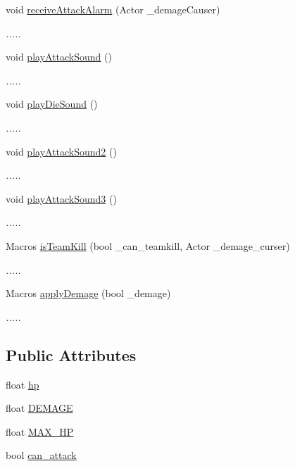 \begin{DoxyCompactItemize}
void \hyperlink{class_enemy___character_af291c216d2d7ce2c83e71cb151cf13ee}{receive\+Attack\+Alarm} (Actor \+\_\+demage\+Causer)
\begin{DoxyCompactList}\small\item\em ..... \end{DoxyCompactList}\item 
void \hyperlink{class_enemy___character_a8c8cc52e86cc963f5655b148bd39d27a}{play\+Attack\+Sound} ()
\begin{DoxyCompactList}\small\item\em ..... \end{DoxyCompactList}\item 
void \hyperlink{class_enemy___character_a7e4f2603e52f32f5823ec13e3bfea030}{play\+Die\+Sound} ()
\begin{DoxyCompactList}\small\item\em ..... \end{DoxyCompactList}\item 
void \hyperlink{class_enemy___character_ada6e551c65c0dd91b7e8342036406e7a}{play\+Attack\+Sound2} ()
\begin{DoxyCompactList}\small\item\em ..... \end{DoxyCompactList}\item 
void \hyperlink{class_enemy___character_a0cf94922a5d6b054efaa3a37ec4557e6}{play\+Attack\+Sound3} ()
\begin{DoxyCompactList}\small\item\em ..... \end{DoxyCompactList}\item 
Macros \hyperlink{class_enemy___character_a05b0072de08ac991ff3bc139c4be350f}{is\+Team\+Kill} (bool \+\_\+can\+\_\+teamkill, Actor \+\_\+demage\+\_\+curser)
\begin{DoxyCompactList}\small\item\em ..... \end{DoxyCompactList}\item 
Macros \hyperlink{class_enemy___character_acb2526ab98b23f7928215895caf0532c}{apply\+Demage} (bool \+\_\+demage)
\begin{DoxyCompactList}\small\item\em ..... \end{DoxyCompactList}\end{DoxyCompactItemize}
\subsection*{Public Attributes}
\begin{DoxyCompactItemize}
\item 
float \hyperlink{class_enemy___character_af249f722b34df3e44a6fe14330b99bd4}{hp}
\item 
float \hyperlink{class_enemy___character_aea87cbc161a3dca85393f7da1e4ae923}{D\+E\+M\+A\+GE}
\item 
float \hyperlink{class_enemy___character_a610d52a2f58f031c193b02f36ccaa5e2}{M\+A\+X\+\_\+\+HP}
\item 
bool \hyperlink{class_enemy___character_af40d81990cc8500236418d252857ada0}{can\+\_\+attack}
\end{DoxyCompactItemize}



